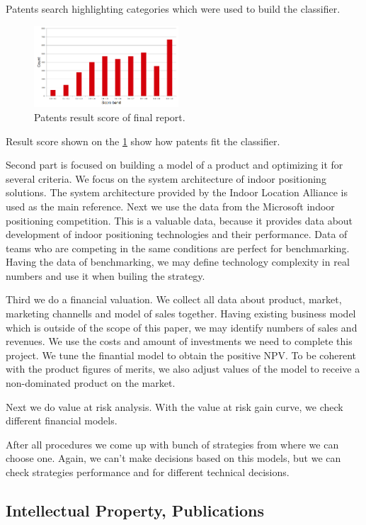 Patents search highlighting categories which were used to build the classifier.

\begin{figure}[h]
    \centering
    \includegraphics[width=0.48\textwidth]{img/patents/score.png}
    \caption{Patents result score of final report.}
    \label{fig:Patent-score}
\end{figure}

Result score shown on the \ref{fig:Patent-score} show how patents fit the classifier.


Second part is focused on building a model of a product and optimizing it for several criteria.
We focus on the system architecture of indoor positioning solutions. The system architecture provided by the Indoor Location Alliance is used as the main reference. Next we use the data from the Microsoft indoor positioning competition. This is a valuable data, because it provides data about development of indoor positioning technologies and their performance. Data of teams who are competing in the same conditions are perfect for benchmarking. Having the data of benchmarking, we may define technology complexity in real numbers and use it when builing the strategy.

Third we do a financial valuation. We collect all data about product, market, marketing channells and model of sales together.
Having existing business model which is outside of the scope of this paper, we may identify numbers of sales and revenues.
We use the costs and amount of investments we need to complete this project.
We tune the finantial model to obtain the positive NPV. To be coherent with the product figures of merits, we also adjust values of the model to receive a non-dominated product on the market.

Next we do value at risk analysis. With the value at risk gain curve, we check different financial models.

After all procedures we come up with bunch of strategies from where we can choose one. Again, we can't make decisions based on this models, but we can check strategies performance and for different technical decisions.

\subsection{Intellectual Property, Publications}
